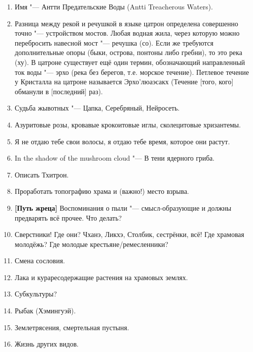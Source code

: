 \begin{enumerate}
\item Имя "--- Антти Предательские Воды (Antti Treacherous Waters).

\item Разница между рекой и речушкой в языке цатрон определена совершенно точно "--- устройством мостов.
Любая водная жила, через которую можно перебросить навесной мост "--- речушка (со).
Если же требуются дополнительные опоры (быки, острова, понтоны либо гребни), то это река (ху).
В цатроне существует ещё один термин, обозначающий направленный ток воды "--- эрхо (река без берегов, т.е. морское течение).
Петлевое течение у Кристалла на цатроне называется Эрхо'люаэсакх (Течение [того, кого] обманули в [последний] раз).

\item Судьба жывотных "--- Цапка, Серебряный, Нейросеть.

\item Азуритовые розы, кровавые крокоитовые иглы, сколецитовые хризантемы.

\item Я не отдаю тебе свои волосы, я отдаю тебе время, которое они растут.

\item In the shadow of the mushroom cloud "--- В тени ядерного гриба.

\item Описать Тхитрон.

\item Проработать топографию храма и (важно!) место взрыва.

\item \textbf{[Путь жреца]} Воспоминания о пыли "--- смысл-образующие и должны предварять всё прочее.
Что делать?

\item Сверстники!
Где они?
Чханэ, Ликхэ, Столбик, сестрёнки, всё!
Где храмовая молодёжь?
Где молодые крестьяне/ремесленники?

\item Смена сословия.

\item Лака и кураресодержащие растения на храмовых землях.

\item Субкультуры?

\item Рыбак (Хэмингуэй).

\item Землетрясения, смертельная пустыня.

\item Жизнь других видов.


\end{enumerate}
